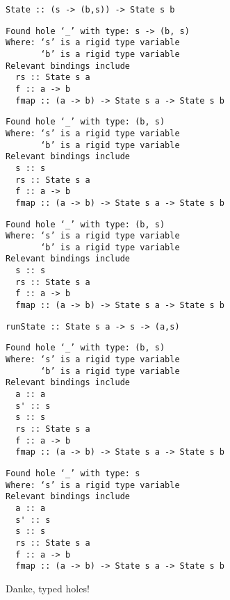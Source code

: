 \documentclass{beamer}
\begin{document}
\begin{frame}[fragile]
\begin{overprint}
\begin{verbatim}
State :: (s -> (b,s)) -> State s b
\end{verbatim}
\begin{verbatim}
Found hole ‘_’ with type: s -> (b, s)
Where: ‘s’ is a rigid type variable
       ‘b’ is a rigid type variable
Relevant bindings include
  rs :: State s a
  f :: a -> b
  fmap :: (a -> b) -> State s a -> State s b
\end{verbatim}
\begin{verbatim}
Found hole ‘_’ with type: (b, s)
Where: ‘s’ is a rigid type variable
       ‘b’ is a rigid type variable
Relevant bindings include
  s :: s
  rs :: State s a
  f :: a -> b
  fmap :: (a -> b) -> State s a -> State s b
\end{verbatim}
\begin{verbatim}
Found hole ‘_’ with type: (b, s)
Where: ‘s’ is a rigid type variable
       ‘b’ is a rigid type variable
Relevant bindings include
  s :: s
  rs :: State s a
  f :: a -> b
  fmap :: (a -> b) -> State s a -> State s b
\end{verbatim}
\begin{verbatim}
runState :: State s a -> s -> (a,s)
\end{verbatim}

\begin{verbatim}
Found hole ‘_’ with type: (b, s)
Where: ‘s’ is a rigid type variable
       ‘b’ is a rigid type variable
Relevant bindings include
  a :: a
  s' :: s
  s :: s
  rs :: State s a
  f :: a -> b
  fmap :: (a -> b) -> State s a -> State s b
\end{verbatim}
\begin{verbatim}
Found hole ‘_’ with type: s
Where: ‘s’ is a rigid type variable
Relevant bindings include
  a :: a
  s' :: s
  s :: s
  rs :: State s a
  f :: a -> b
  fmap :: (a -> b) -> State s a -> State s b
\end{verbatim}
\end{overprint}
\normalsize
\bigskip
{}
Danke, typed holes!
\end{frame}
\end{document}

